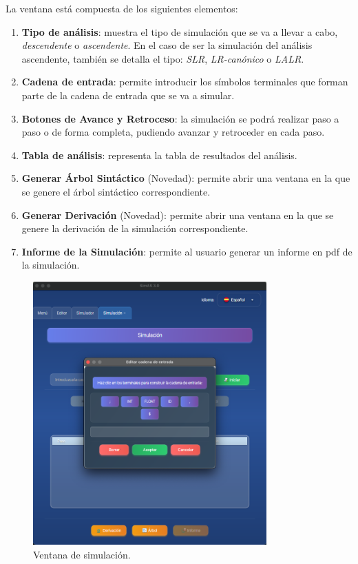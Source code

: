 La ventana está compuesta de los siguientes elementos:
\begin{enumerate}
  \item \textbf{Tipo de análisis}: muestra el tipo de simulación que se va a llevar a cabo, \textit{descendente} o \textit{ascendente}. En el caso de ser la simulación del análisis ascendente, también se detalla el tipo: \textit{SLR}, \textit{LR-canónico} o \textit{LALR}.
 \item \textbf{Cadena de entrada}: permite introducir los símbolos terminales que forman parte de la cadena de entrada que se va a simular.
 \item \textbf{Botones de Avance y Retroceso}: la simulación se podrá realizar paso a paso o de forma completa, pudiendo avanzar y retroceder en cada paso.
 \item \textbf{Tabla de análisis}: representa la tabla de resultados del análisis.
 \item \textbf{Generar Árbol Sintáctico} (Novedad): permite abrir una ventana en la que se genere el árbol sintáctico correspondiente.
 \item \textbf{Generar Derivación} (Novedad): permite abrir una ventana en la que se genere la derivación de la simulación correspondiente.
 \item \textbf{Informe de la Simulación}: permite al usuario generar un informe en pdf de la simulación.
\end{enumerate}

\begin{figure}[htp]
\centering
	\includegraphics[width=0.8\textwidth]{figuras2/simulador/simulacion_cadenaEntrada.png}
	\caption{Ventana de simulación.}
	\label{fig:d7}
\end{figure}

